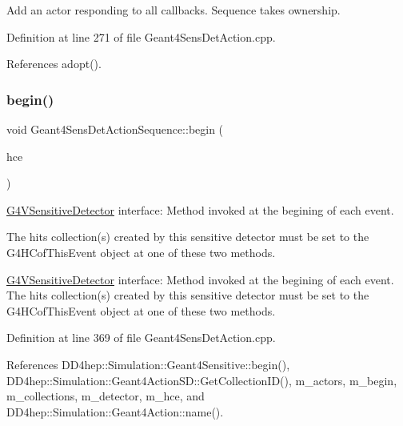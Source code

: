 Add an actor responding to all callbacks. Sequence takes ownership. 



Definition at line 271 of file Geant4\+Sens\+Det\+Action.\+cpp.



References adopt().

\hypertarget{class_d_d4hep_1_1_simulation_1_1_geant4_sens_det_action_sequence_a59c1e52c811f9385da294c0b18704ab1}{}\label{class_d_d4hep_1_1_simulation_1_1_geant4_sens_det_action_sequence_a59c1e52c811f9385da294c0b18704ab1} 
\subsubsection{\texorpdfstring{begin()}{begin()}}
{\footnotesize\ttfamily void Geant4\+Sens\+Det\+Action\+Sequence\+::begin (\begin{DoxyParamCaption}\item[{G4\+H\+Cof\+This\+Event $\ast$}]{hce }\end{DoxyParamCaption})\hspace{0.3cm}{\ttfamily [virtual]}}



\hyperlink{class_g4_v_sensitive_detector}{G4\+V\+Sensitive\+Detector} interface\+: Method invoked at the begining of each event. 

The hits collection(s) created by this sensitive detector must be set to the G4\+H\+Cof\+This\+Event object at one of these two methods.

\hyperlink{class_g4_v_sensitive_detector}{G4\+V\+Sensitive\+Detector} interface\+: Method invoked at the begining of each event. The hits collection(s) created by this sensitive detector must be set to the G4\+H\+Cof\+This\+Event object at one of these two methods. 

Definition at line 369 of file Geant4\+Sens\+Det\+Action.\+cpp.



References D\+D4hep\+::\+Simulation\+::\+Geant4\+Sensitive\+::begin(), D\+D4hep\+::\+Simulation\+::\+Geant4\+Action\+S\+D\+::\+Get\+Collection\+I\+D(), m\+\_\+actors, m\+\_\+begin, m\+\_\+collections, m\+\_\+detector, m\+\_\+hce, and D\+D4hep\+::\+Simulation\+::\+Geant4\+Action\+::name().

